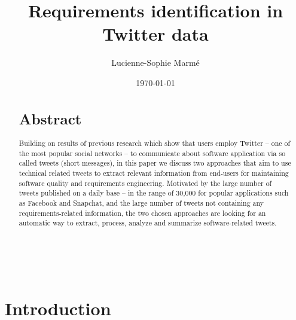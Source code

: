\documentclass[a4paper,10pt, bibliography=totocnumbered]{scrreprt}
\author{Lucienne-Sophie Marmé}
\title{Requirements identification in Twitter data}
\date{\today}
\makeatletter
\renewcommand{\maketitle}{\begin{titlepage}
    \vskip 10\p@
    \hbox{
      \vrule depth 0.99\textheight
        \mbox{\hspace{2em}}
      \vtop{
        \vskip 10\p@
        \hspace{4pt}
        \vskip 50\p@
        \begin{flushleft}
          \Large \@author \par
        \end{flushleft}
        \vskip 50\p@
        \begin{flushleft}
          \huge \bfseries \@title \par
        \end{flushleft}
        \begin{flushleft}
          \Large \bfseries \@subtitle \par
        \end{flushleft}
        \vskip 70\p@
        \begin{flushleft}
          \Large \@publishers \par
        \end{flushleft}
        \vskip 50\p@
        \begin{flushleft}
          \Large \@date \par
        \end{flushleft}
        }}
  \end{titlepage}
}
\makeatother
\begin{document}
\maketitle


\begin{abstract}
\section*{Abstract}
Building on results of previous research which show that users employ Twitter – one of the most popular social networks – to communicate about software application via so called tweets (short messages), in this paper we discuss two approaches that aim to use technical related tweets to extract relevant information from end-users for maintaining software quality and requirements engineering. Motivated by the large number of tweets published on a daily base – in the range of 30,000 for popular applications such as Facebook and Snapchat, and the large number of tweets not containing any requirements-related information, the two chosen approaches are looking for an automatic way to extract, process, analyze and summarize software-related tweets.
\end{abstract}


\tableofcontents

\chapter{Introduction}
\end{document}
